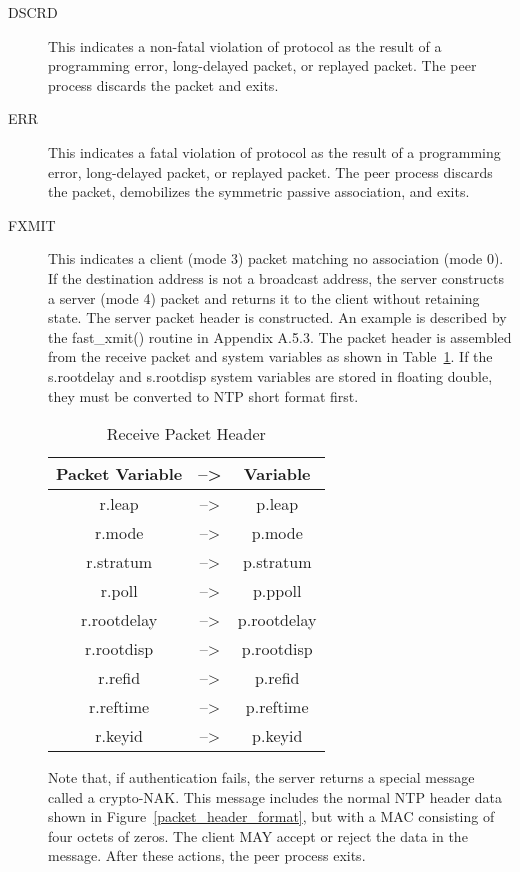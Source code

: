 \begin{description}

  \item[DSCRD] This indicates a non-fatal violation of protocol as the
    result of a programming error, long-delayed packet, or replayed
    packet. The peer process discards the packet and exits.

  \item[ERR] This indicates a fatal violation of protocol as the result of a
    programming error, long-delayed packet, or replayed packet. The peer
    process discards the packet, demobilizes the symmetric passive
    association, and exits.

  \item[FXMIT] This indicates a client (mode 3) packet matching no
    association (mode 0). If the destination address is not a broadcast
    address, the server constructs a server (mode 4) packet and returns
    it to the client without retaining state. The server packet header
    is constructed. An example is described by the fast\_xmit() routine
    in Appendix A.5.3. The packet header is assembled from the receive
    packet and system variables as shown in Table~\ref{receive_packet_header}. If the
    s.rootdelay and s.rootdisp system variables are stored in floating
    double, they must be converted to NTP short format first.

    \begin{table}[htb]
    \center
    \begin{tabular}{c | c | c}
    Packet Variable & --> & Variable \\
    \hline
    \hline
    r.leap & --> & p.leap \\
    r.mode & --> & p.mode \\
    r.stratum & --> & p.stratum \\
    r.poll & --> & p.ppoll \\
    r.rootdelay & --> & p.rootdelay \\
    r.rootdisp & --> & p.rootdisp \\
    r.refid & --> & p.refid \\
    r.reftime & --> & p.reftime \\
    r.keyid & --> & p.keyid \\
    \hline
    \end{tabular}
    \label{receive_packet_header}
    \caption{Receive Packet Header}
    \end{table}

    Note that, if authentication fails, the server returns a special
    message called a crypto-NAK. This message includes the normal NTP
    header data shown in Figure~\ref{packet_header_format}, but with a MAC consisting of four
    octets of zeros. The client MAY accept or reject the data in the
    message. After these actions, the peer process exits.


\end{description}
